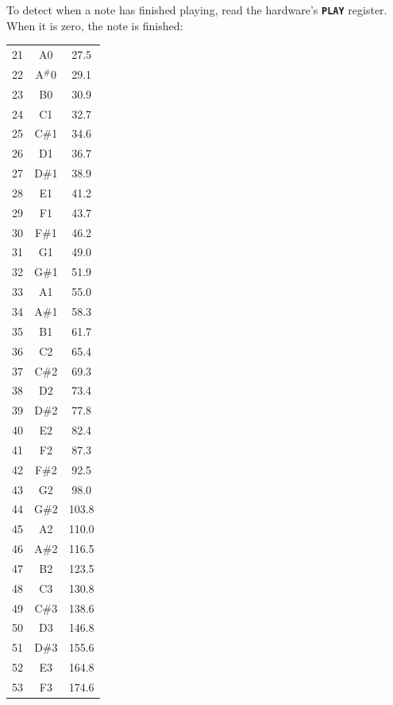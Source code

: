 \documentclass[10pt]{book}
\newcommand{\mach}[1]{\texttt{\textbf{#1}}}
\begin{document}
\begin{CJK}{UTF8}{gkai}
To detect when a note has finished playing, read the hardware's \mach{PLAY} register.
When it is zero, the note is finished:

\footnotesize
\twocolumn
\begin{spacing}{0.99}
\begin{supertabular}{ccc}
\label{MIDI}
21  & A0  &  27.5 \\
22  & A$^\#$0 &  29.1 \\
23  & B0  &  30.9 \\
24  & C1  &  32.7 \\
25  & C\#1 &  34.6 \\
26  & D1  &  36.7 \\
27  & D\#1 &  38.9 \\
28  & E1  &  41.2 \\
29  & F1  &  43.7 \\
30  & F\#1 &  46.2 \\
31  & G1  &  49.0 \\
32  & G\#1 &  51.9  \\
33  & A1  &  55.0  \\
34  & A\#1 &  58.3  \\
35  & B1  &  61.7  \\
36  & C2  &  65.4  \\
37  & C\#2 &  69.3  \\
38  & D2  &  73.4  \\
39  & D\#2 &  77.8  \\
40  & E2  &  82.4  \\
41  & F2  &  87.3  \\
42  & F\#2 &  92.5  \\
43  & G2  &  98.0  \\
44  & G\#2 & 103.8  \\
45  & A2  & 110.0  \\
46  & A\#2 & 116.5  \\
47  & B2  & 123.5  \\
48  & C3  & 130.8  \\
49  & C\#3 & 138.6  \\
50  & D3  & 146.8  \\
51  & D\#3 & 155.6  \\
52  & E3  & 164.8  \\
53  & F3  & 174.6  \\

\end{supertabular}
\end{spacing}
\end{CJK}
\end{document}

